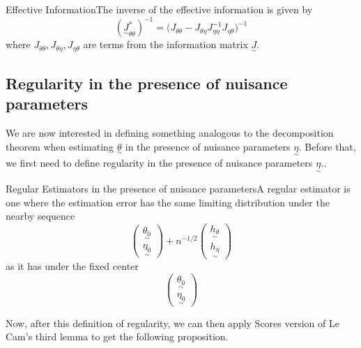 \documentclass[twoside]{article}
\newcommand{\utilde}{\underset{\sim}}
\begin{document}
\begin{proposition_exam}{Effective Information}{}The inverse of the effective information is given by 
$$
(\utilde{J}_{\theta \theta}^{*})^{-1} = \bigg(J_{\theta \theta} - J_{\theta \eta}J_{\eta \eta}^{-1}J_{\eta \theta} \bigg)^{-1}
$$
where $J_{\theta \theta}, J_{\theta \eta}, J_{\eta \theta}$ are terms from the information matrix $\utilde{J}.$
\end{proposition_exam}

\subsection{Regularity in the presence of nuisance parameters}


We are now interested in defining something analogous to the decomposition theorem when estimating $\utilde{\theta}$ in the presence of nuisance parameters $\utilde{\eta}.$ Before that, we first need to define regularity in the presence of nuisance parameters $\utilde{\eta}.$.

\begin{definition_exam}{Regular Estimators in the presence of nuisance parameters}{}A regular estimator is one where the estimation error has the same limiting distribution under the nearby sequence 
$$
\begin{pmatrix}
\utilde{\theta_0}\\
\utilde{\eta_0}
\end{pmatrix}
 + n^{-1/2}
\begin{pmatrix}
\utilde{h_{\theta}}\\
\utilde{h_{\eta}}
\end{pmatrix}
$$
as it has under the fixed center
$$
\begin{pmatrix}
\utilde{\theta_0}\\
\utilde{\eta_0}
\end{pmatrix}
$$
\end{definition_exam}

Now, after this definition of regularity, we can then apply Scores version of Le Cam's third lemma to get the following proposition.
\end{document}
